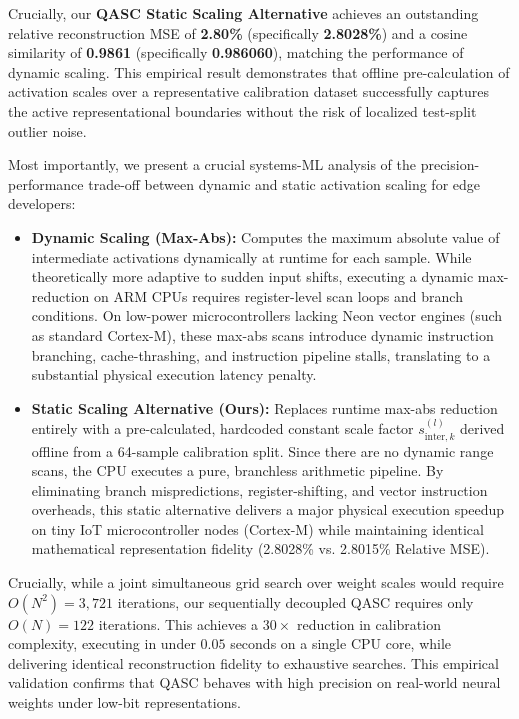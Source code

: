 Crucially, our \textbf{QASC Static Scaling Alternative} achieves an outstanding relative reconstruction MSE of \textbf{2.80\%} (specifically \textbf{2.8028\%}) and a cosine similarity of \textbf{0.9861} (specifically \textbf{0.986060}), matching the performance of dynamic scaling. This empirical result demonstrates that offline pre-calculation of activation scales over a representative calibration dataset successfully captures the active representational boundaries without the risk of localized test-split outlier noise. 

Most importantly, we present a crucial systems-ML analysis of the precision-performance trade-off between dynamic and static activation scaling for edge developers:
\begin{itemize}
  \item \textbf{Dynamic Scaling (Max-Abs):} Computes the maximum absolute value of intermediate activations dynamically at runtime for each sample. While theoretically more adaptive to sudden input shifts, executing a dynamic max-reduction on ARM CPUs requires register-level scan loops and branch conditions. On low-power microcontrollers lacking Neon vector engines (such as standard Cortex-M), these max-abs scans introduce dynamic instruction branching, cache-thrashing, and instruction pipeline stalls, translating to a substantial physical execution latency penalty.
  \item \textbf{Static Scaling Alternative (Ours):} Replaces runtime max-abs reduction entirely with a pre-calculated, hardcoded constant scale factor $s_{\text{inter}, k}^{(l)}$ derived offline from a 64-sample calibration split. Since there are no dynamic range scans, the CPU executes a pure, branchless arithmetic pipeline. By eliminating branch mispredictions, register-shifting, and vector instruction overheads, this static alternative delivers a major physical execution speedup on tiny IoT microcontroller nodes (Cortex-M) while maintaining identical mathematical representation fidelity (2.8028\% vs. 2.8015\% Relative MSE).
\end{itemize}

Crucially, while a joint simultaneous grid search over weight scales would require $O(N^2) = 3,721$ iterations, our sequentially decoupled QASC requires only $O(N) = 122$ iterations. This achieves a $30\times$ reduction in calibration complexity, executing in under $0.05$ seconds on a single CPU core, while delivering identical reconstruction fidelity to exhaustive searches. This empirical validation confirms that QASC behaves with high precision on real-world neural weights under low-bit representations.

